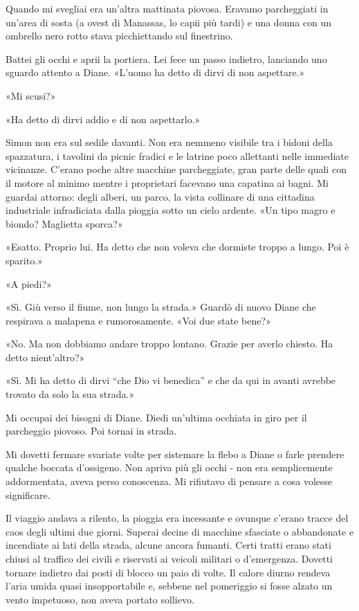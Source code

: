Quando mi svegliai era un'altra mattinata piovosa. Eravamo parcheggiati
in un'area di sosta (a ovest di Manassas, lo capii più tardi) e una
donna con un ombrello nero rotto stava picchiettando sul finestrino.

Battei gli occhi e aprii la portiera. Lei fece un passo indietro,
lanciando uno sguardo attento a Diane. «L'uomo ha detto di dirvi di non
aspettare.»

«Mi scusi?»

«Ha detto di dirvi addio e di non aspettarlo.»

Simon non era sul sedile davanti. Non era nemmeno visibile tra i bidoni
della spazzatura, i tavolini da picnic fradici e le latrine poco
allettanti nelle immediate vicinanze. C'erano poche altre macchine
parcheggiate, gran parte delle quali con il motore al minimo mentre i
proprietari facevano una capatina ai bagni. Mi guardai attorno: degli
alberi, un parco, la vista collinare di una cittadina industriale
infradiciata dalla pioggia sotto un cielo ardente. «Un tipo magro e
biondo? Maglietta sporca?»

«Esatto. Proprio lui. Ha detto che non voleva che dormiste troppo a
lungo. Poi è sparito.»

«A piedi?»

«Sì. Giù verso il fiume, non lungo la strada.» Guardò di nuovo Diane che
respirava a malapena e rumorosamente. «Voi due state bene?»

«No. Ma non dobbiamo andare troppo lontano. Grazie per averlo chiesto.
Ha detto nient'altro?»

«Sì. Mi ha detto di dirvi ``che Dio vi benedica'' e che da qui in avanti
avrebbe trovato da solo la sua strada.»

Mi occupai dei bisogni di Diane. Diedi un'ultima occhiata in giro per il
parcheggio piovoso. Poi tornai in strada.

\separatorefiori

Mi dovetti fermare svariate volte per sistemare la flebo a Diane o farle
prendere qualche boccata d'ossigeno. Non apriva più gli occhi - non era
semplicemente addormentata, aveva perso conoscenza. Mi rifiutavo di
pensare a cosa volesse significare.

Il viaggio andava a rilento, la pioggia era incessante e ovunque c'erano
tracce del caos degli ultimi due giorni. Superai decine di macchine
sfasciate o abbandonate e incendiate ai lati della strada, alcune ancora
fumanti. Certi tratti erano stati chiusi al traffico dei civili e
riservati ai veicoli militari o d'emergenza. Dovetti tornare indietro
dai posti di blocco un paio di volte. Il calore diurno rendeva l'aria
umida quasi insopportabile e, sebbene nel pomeriggio si fosse alzato un
vento impetuoso, non aveva portato sollievo.

